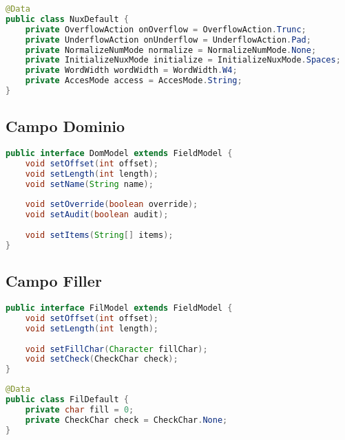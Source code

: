 \documentclass[a4paper,10pt]{report}
\begin{document}
\begin{lstlisting}[language=java, caption=class NuxDefault, 
label=code:NuxDefault]
@Data
public class NuxDefault {
    private OverflowAction onOverflow = OverflowAction.Trunc;
    private UnderflowAction onUnderflow = UnderflowAction.Pad;
    private NormalizeNumMode normalize = NormalizeNumMode.None;
    private InitializeNuxMode initialize = InitializeNuxMode.Spaces;
    private WordWidth wordWidth = WordWidth.W4;
    private AccesMode access = AccesMode.String;
}
\end{lstlisting}

\subsection{Campo Dominio}

\begin{lstlisting}[language=java, caption=interfaccia DomModel, 
label=code:DomModel]
public interface DomModel extends FieldModel {
    void setOffset(int offset);
    void setLength(int length);
    void setName(String name);
    
    void setOverride(boolean override);
    void setAudit(boolean audit);
    
    void setItems(String[] items);
}
\end{lstlisting}


\subsection{Campo Filler}

\begin{lstlisting}[language=java, caption=interfaccia FilModel, 
label=code:FilModel]
public interface FilModel extends FieldModel {
    void setOffset(int offset);
    void setLength(int length);
    
    void setFillChar(Character fillChar);
    void setCheck(CheckChar check);
}
\end{lstlisting}

\begin{lstlisting}[language=java, caption=class FilDefault, 
label=code:FilDefault]
@Data
public class FilDefault {
    private char fill = 0;
    private CheckChar check = CheckChar.None;
}
\end{lstlisting}
\end{document}
